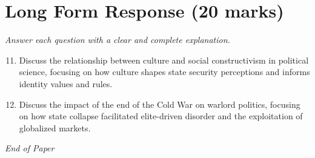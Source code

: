 \documentclass[12pt]{article}
\begin{document}
\section*{Long Form Response (20 marks)}
\textit{Answer each question with a clear and complete explanation.}
\begin{enumerate}[label=\arabic*.]
\setcounter{enumi}{10}
\item Discuss the relationship between culture and social constructivism in political science, focusing on how culture shapes state security perceptions and informs identity values and rules.
\item Discuss the impact of the end of the Cold War on warlord politics, focusing on how state collapse facilitated elite-driven disorder and the exploitation of globalized markets.
\end{enumerate}

\vfill
\noindent\textit{End of Paper}
\end{document}
